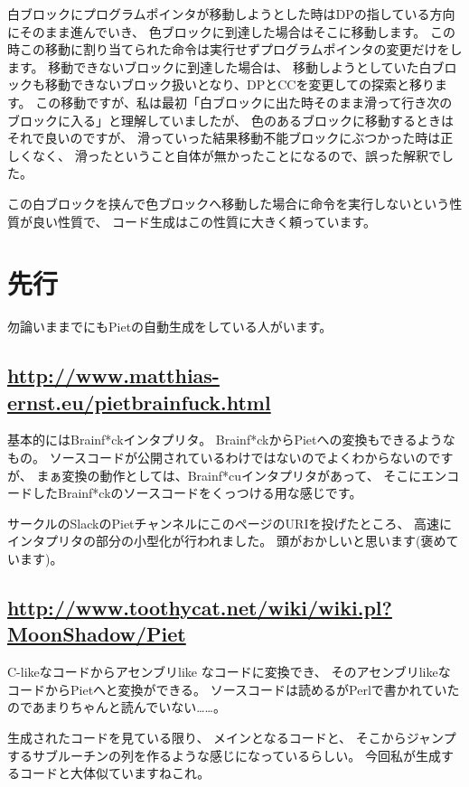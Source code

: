 白ブロックにプログラムポインタが移動しようとした時はDPの指している方向にそのまま進んでいき、
色ブロックに到達した場合はそこに移動します。
この時この移動に割り当てられた命令は実行せずプログラムポインタの変更だけをします。
移動できないブロックに到達した場合は、
移動しようとしていた白ブロックも移動できないブロック扱いとなり、DPとCCを変更しての探索と移ります。
この移動ですが、私は最初「白ブロックに出た時そのまま滑って行き次のブロックに入る」と理解していましたが、
色のあるブロックに移動するときはそれで良いのですが、
滑っていった結果移動不能ブロックにぶつかった時は正しくなく、
滑ったということ自体が無かったことになるので、誤った解釈でした。

この白ブロックを挟んで色ブロックへ移動した場合に命令を実行しないという性質が良い性質で、
コード生成はこの性質に大きく頼っています。

\section{先行}

勿論いままでにもPietの自動生成をしている人がいます。

\subsection{\texorpdfstring{\url{http://www.matthias-ernst.eu/pietbrainfuck.html}}{http://www.matthias-ernst.eu/pietbrainfuck.html}}

基本的にはBrainf*ckインタプリタ。
Brainf*ckからPietへの変換もできるようなもの。
ソースコードが公開されているわけではないのでよくわからないのですが、
まぁ変換の動作としては、Brainf*cuインタプリタがあって、
そこにエンコードしたBrainf*ckのソースコードをくっつける用な感じです。

サークルのSlackのPietチャンネルにこのページのURIを投げたところ、
高速にインタプリタの部分の小型化が行われました。
頭がおかしいと思います(褒めています)。

\subsection{\texorpdfstring{\url{http://www.toothycat.net/wiki/wiki.pl?MoonShadow/Piet}}{http://www.toothycat.net/wiki/wiki.pl?MoonShadow/Piet}}

C-likeなコードからアセンブリlike なコードに変換でき、 そのアセンブリlikeなコードからPietへと変換ができる。
ソースコードは読めるがPerlで書かれていたのであまりちゃんと読んでいない\dots\dots。

生成されたコードを見ている限り、 メインとなるコードと、
そこからジャンプするサブルーチンの列を作るような感じになっているらしい。
今回私が生成するコードと大体似ていますねこれ。

